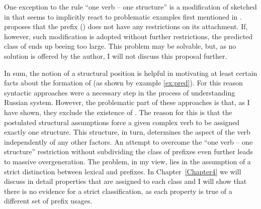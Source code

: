 One exception to the rule ``one verb -- one structure'' is a modification of \citet{Tatevosov:09} sketched in \citet{Tatevosov:13} that seems to implicitly react to problematic examples first mentioned in \citet{Zinova:12}. \citet{Tatevosov:13} proposes that the  prefix  () does not have any restrictions on its attachment. If, however, such modification is adopted without further restrictions, the predicted class of  ends up beeing too large. This problem may be solvable, but, as no solution is offered by the author, I will not discuss this proposal further.

%
In sum, the notion of a structural position is helpful in motivating at least certain facts about the formation of  (as shown by example \ref{ex:pred}). For this reason syntactic approaches were a necessary step in the process of understanding Russian  system. However, the problematic part of these approaches is that, as I have shown, they exclude the existence of . The reason for this is that the postulated structural assumptions force a given complex verb to be assigned exactly one structure. This structure, in turn, determines the aspect of the verb independently of any other factors. An attempt to overcome the ``one verb -- one structure'' restriction without subdividing the class of  prefixes even further  \citep{Tatevosov:13} leads to massive overgeneration. The problem, in my view, lies in the assumption of a strict distinction between lexical and  prefixes. In Chapter~\ref{Chapter4} we will discuss in detail properties that are assigned to each class and I will show that there is no evidence for a strict classification, as each property is true of a different set of prefix usages.

